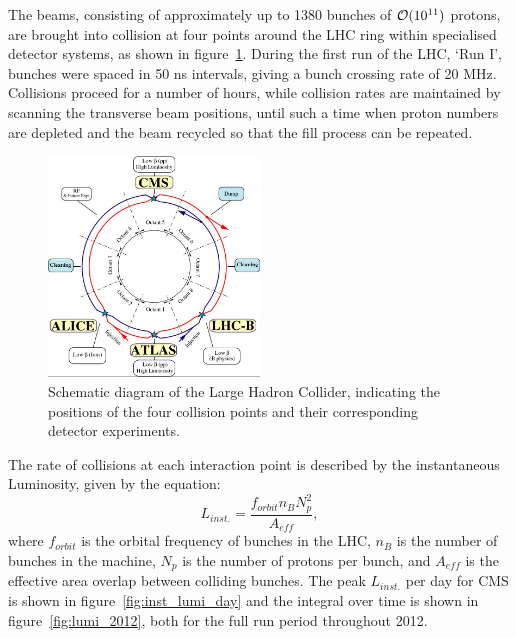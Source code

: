 The beams, consisting of approximately up to 1380 bunches of $\mathcal{O}(10^{11})$
protons, are brought into collision
at four points around the LHC ring within specialised detector systems, as shown
in figure~\ref{fig:lhc_diagram}. During the
first run of the LHC, `Run I', bunches were spaced in 50 ns intervals, giving
a bunch crossing rate of 20 MHz. Collisions proceed for a number of hours, 
while collision rates are maintained by scanning the transverse beam positions, 
until such a time when proton numbers are depleted and the beam recycled so that
the fill process can be repeated.

\begin{figure}[ht!]
\centering
\includegraphics[width=0.5\textwidth]{Figs/machine/lhc-schematic.jpg}
\caption{Schematic diagram of the Large Hadron Collider, indicating the 
positions of the four collision points and their corresponding detector 
experiments.}
\label{fig:lhc_diagram}
\end{figure}


The rate of collisions at each interaction point is described by the 
instantaneous Luminosity, given by the equation:
% 
\begin{equation}
L_{inst.} = \frac{f_{orbit}n_{B}N_p^2}{A_{eff}} ,
\end{equation}
% 
where $f_{orbit}$ is the orbital frequency of bunches in the LHC, $n_B$ is the 
number of bunches in the machine, $N_p$ is the number of protons per bunch, and 
$A_{eff}$ is the effective area overlap between colliding bunches. The peak 
$L_{inst.}$ per day for CMS is shown in figure~\ref{fig:inst_lumi_day} and the
integral over time is shown in figure~\ref{fig:lumi_2012}, both for the full run
period throughout 2012.

